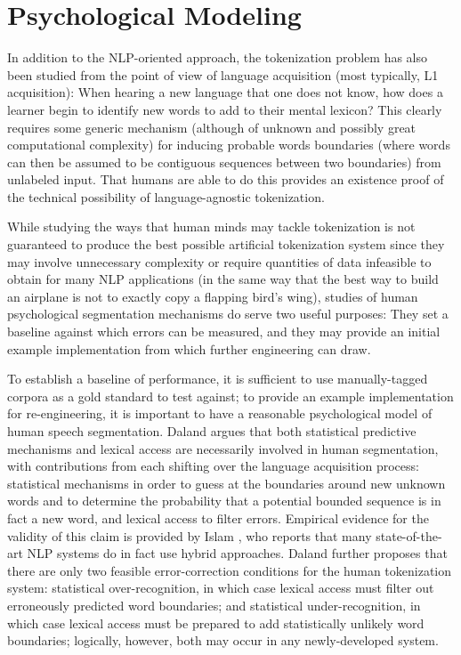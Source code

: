 
\section{Psychological Modeling}

In addition to the NLP-oriented approach, the tokenization problem has also been studied from the point of view of language acquisition (most typically, L1 acquisition): When hearing a new language that one does not know, how does a learner begin to identify new words to add to their mental lexicon? This clearly requires some generic mechanism (although of unknown and possibly great computational complexity) for inducing probable words boundaries (where words can then be assumed to be contiguous sequences between two boundaries) from unlabeled input. That humans are able to do this provides an existence proof of the technical possibility of language-agnostic tokenization.

While studying the ways that human minds may tackle tokenization is not guaranteed to produce the best possible artificial tokenization system since they may involve unnecessary complexity or require quantities of data infeasible to obtain for many NLP applications (in the same way that the best way to build an airplane is not to exactly copy a flapping bird's wing), studies of human psychological segmentation mechanisms do serve two useful purposes: They set a baseline against which errors can be measured, and they may provide an initial example implementation from which further engineering can draw\cite{daland09}.

To establish a baseline of performance, it is sufficient to use manually-tagged corpora as a gold standard to test against; to provide an example implementation for re-engineering, it is important to have a reasonable psychological model of human speech segmentation. Daland\cite{daland09} argues that both statistical predictive mechanisms and lexical access are necessarily involved in human segmentation, with contributions from each shifting over the language acquisition process: statistical mechanisms in order to guess at the boundaries around new unknown words and to determine the probability that a potential bounded sequence is in fact a new word, and lexical access to filter errors. Empirical evidence for the validity of this claim is provided by Islam \cite{islam07}, who reports that many state-of-the-art NLP systems do in fact use hybrid approaches. Daland\cite{daland09} further proposes that there are only two feasible error-correction conditions for the human tokenization system: statistical over-recognition, in which case lexical access must filter out erroneously predicted word boundaries; and statistical under-recognition, in which case lexical access must be prepared to add statistically unlikely word boundaries; logically, however, both may occur in any newly-developed system.

